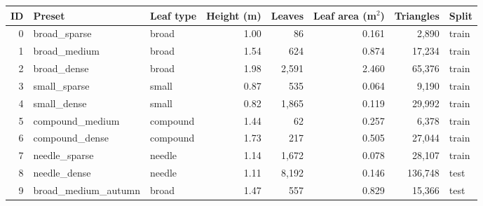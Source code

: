 \begin{tabular}{rllrrrrl}
\toprule
ID & Preset & Leaf type & Height (m) & Leaves & Leaf area (m$^2$) & Triangles & Split \\
\midrule
0 & broad\_sparse & broad & 1.00 & 86 & 0.161 & 2{,}890 & train \\
1 & broad\_medium & broad & 1.54 & 624 & 0.874 & 17{,}234 & train \\
2 & broad\_dense & broad & 1.98 & 2{,}591 & 2.460 & 65{,}376 & train \\
3 & small\_sparse & small & 0.87 & 535 & 0.064 & 9{,}190 & train \\
4 & small\_dense & small & 0.82 & 1{,}865 & 0.119 & 29{,}992 & train \\
5 & compound\_medium & compound & 1.44 & 62 & 0.257 & 6{,}378 & train \\
6 & compound\_dense & compound & 1.73 & 217 & 0.505 & 27{,}044 & train \\
7 & needle\_sparse & needle & 1.14 & 1{,}672 & 0.078 & 28{,}107 & train \\
8 & needle\_dense & needle & 1.11 & 8{,}192 & 0.146 & 136{,}748 & test \\
9 & broad\_medium\_autumn & broad & 1.47 & 557 & 0.829 & 15{,}366 & test \\
\bottomrule
\end{tabular}
